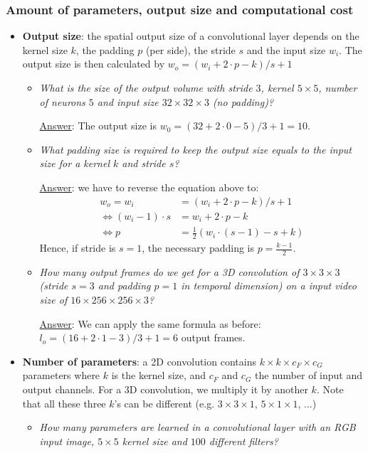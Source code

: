 \subsubsection{Amount of parameters, output size and computational cost}
\begin{itemize}
	\item \textbf{Output size}: the spatial output size of a convolutional layer depends on the kernel size $k$, the padding $p$ (per side), the stride $s$ and the input size $w_i$. The output size is then calculated by $w_o = (w_i + 2\cdot p - k)/s + 1$
	\begin{itemize}
		\item \textit{What is the size of the output volume with stride $3$, kernel $5\times 5$, number of neurons $5$ and input size $32\times 32\times 3$ (no padding)?}
		
		\underline{Answer}: The output size is $w_0 = (32 + 2\cdot 0 - 5)/3 + 1 = 10$.
		
		\item \textit{What padding size is required to keep the output size equals to the input size for a kernel $k$ and stride $s$?}
		
		\underline{Answer}: we have to reverse the equation above to:
		\begin{equation*}
			\begin{split}
				w_o = w_i & = (w_i + 2\cdot p - k)/s + 1\\
				\Leftrightarrow (w_i - 1) \cdot s & = w_i + 2\cdot p - k\\
				\Leftrightarrow p & = \frac{1}{2}\left(w_i \cdot \left(s-1\right) - s + k\right)
			\end{split}
		\end{equation*}
		Hence, if stride is $s=1$, the necessary padding is $p=\frac{k-1}{2}$.
		
		\item \textit{How many output frames do we get for a 3D convolution of $3\times 3\times 3$ (stride $s=3$ and padding $p=1$ in temporal dimension) on a input video size of $16\times 256\times 256\times 3$?}
		
		\underline{Answer}: We can apply the same formula as before: $l_o = (16 + 2\cdot 1 - 3)/3 + 1 = 6$ output frames.
	\end{itemize}
	\item \textbf{Number of parameters}: a 2D convolution contains $k\times k\times c_F \times c_G$ parameters where $k$ is the kernel size, and $c_F$ and $c_G$ the number of input and output channels. For a 3D convolution, we multiply it by another $k$. Note that all these three $k$'s can be different (e.g. $3\times 3\times 1$, $5\times 1 \times 1$, ...)
	\begin{itemize}
		\item \textit{How many parameters are learned in a convolutional layer with an RGB input image, $5\times 5$ kernel size and $100$ different filters?}
		

\end{itemize}
\end{itemize}

